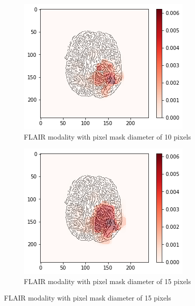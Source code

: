 \begin{figure}[H]
    \centering
    \begin{subfigure}{.32\textwidth}
        \centering
        \includegraphics[width=\linewidth]{chapters/06_hdm/b_Brats18_TCIA08_242_1_L2/38.png}
        \caption{FLAIR modality with pixel mask diameter of 10 pixels}
    \end{subfigure}\hfill%
    \begin{subfigure}{.32\textwidth}
        \centering
        \includegraphics[width=\linewidth]{chapters/06_hdm/circle15/18.png}
        \caption{FLAIR modality with pixel mask diameter of 15 pixels}
    \end{subfigure}\hfill%

\end{figure}
